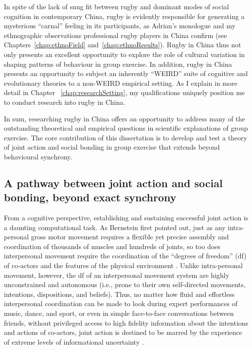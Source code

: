\begin{CJK}{UTF8}{gbsn}
In spite of the lack of snug fit between rugby and dominant modes of social cognition in contemporary China, rugby is evidently responsible for generating a mysterious ``carnal'' feeling in its participants, as Adrian's monologue and my ethnographic observations professional rugby players in China confirm (see Chapters~\ref{chap:ethnoField} and~\ref{chap:ethnoResults}).  Rugby in China thus not only presents an excellent opportunity to explore the role of cultural variation in shaping patterns of behaviour in group exercise.  In addition, rugby in China presents an opportunity to subject an inherently ``WEIRD'' \citep[Western, Educated, Industrial, Rich, and Democratic; cf.][]{Henrich2010d} suite of cognitive and evolutionary theories to a non-WEIRD empirical setting.  As I explain in more detail in Chapter ~\ref{chap:researchSetting}, my qualifications uniquely position me to conduct research into rugby in China.

In sum, researching rugby in China offers an opportunity to address many of the outstanding theoretical and empirical questions in scientific explanations of group exercise.  The core contribution of this dissertation is to develop and test a theory of joint action and social bonding in group exercise that extends beyond behavioural synchrony.


\subsection{A pathway between joint action and social bonding, beyond exact synchrony \label{sect:pathBeyondSynch}}

From a cognitive perspective, establishing and sustaining successful joint action is a daunting computational task.  As Bernstein \textcite{Bernstein1967} first pointed out, just as any intra-personal gross motor movement requires a flexible yet precise assembly and coordination of thousands of muscles and hundreds of joints, so too does interpersonal movement require the coordination of the ``degrees of freedom'' (df) of co-actors and the features of the physical environment \citep{Riley2011}.  Unlike intra-personal movement, however, the df of an interpersonal movement system are highly unconstrained and autonomous (i.e., prone to their own self-directed movements, intentions, dispositions, and beliefs).  Thus, no matter how fluid and effortless interpersonal coordination can be made to look during expert performances of music, dance, and sport, or even in simple face-to-face conversations between friends, without privileged access to high fidelity information about the intentions and actions of co-actors, joint action is destined to be marred by the experience of extreme levels of informational uncertainty \citep{Sebanz2009,Fusaroli2014}.


\end{CJK}
